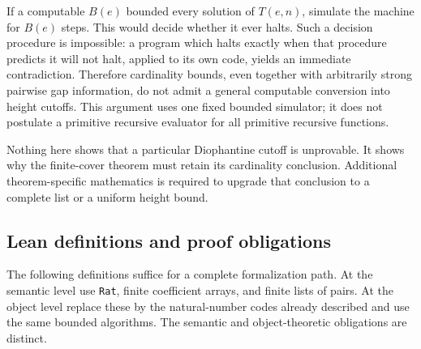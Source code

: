 If a computable $B(e)$ bounded every solution of $T(e,n)$, simulate
the machine for $B(e)$ steps. This would decide whether it ever
halts. Such a decision procedure is impossible: a program which
halts exactly when that procedure predicts it will not halt,
applied to its own code, yields an immediate contradiction.
Therefore cardinality bounds, even together with arbitrarily strong
pairwise gap information, do not admit a general computable
conversion into height cutoffs. This argument uses one fixed bounded
simulator; it does not postulate a primitive recursive evaluator
for all primitive recursive functions.

Nothing here shows that a particular Diophantine cutoff is
unprovable. It shows why the finite-cover theorem must retain its
cardinality conclusion. Additional theorem-specific mathematics is
required to upgrade that conclusion
to a complete list or a uniform height bound.

\subsection{Lean definitions and proof obligations}

The following definitions suffice for a complete formalization path.
At the semantic level use \texttt{Rat}, finite coefficient arrays,
and finite lists of pairs. At the object level replace these by
the natural-number codes already described and use the same
bounded algorithms. The semantic and object-theoretic obligations
are distinct.

